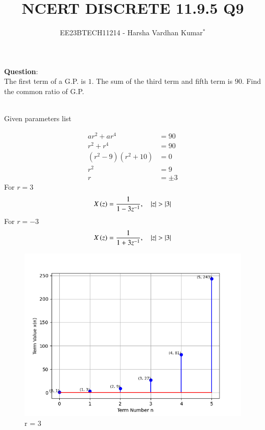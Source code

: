 \documentclass[journal,12pt,twocolumn]{IEEEtran}
\theoremstyle{remark}
\begin{document}

\vspace{3cm}
\title{NCERT DISCRETE 11.9.5 Q9}
\author{EE23BTECH11214 - Harsha Vardhan Kumar$^{*}$%
}
\maketitle
\newpage
\bigskip
\textbf{Question}:\\
The first term of a G.P. is $1$. The sum of the third term and fifth
term is $90$. Find the common ratio of G.P.
\\
\solution\\
\begin{table}[htbp]
\centering

\caption{Given parameters list}
\end{table}
\begin{align}
ar^2 + ar^4 &= 90 \\
r^2 + r^4 &= 90 \\
(r^2 - 9)(r^2 + 10) &= 0 \\
r^2 &= 9 \\
r &= \pm 3
\end{align}
For $r = 3$
\begin{align}
X\left(z\right) = \frac{1}{1 - 3z^{-1}}  , \quad \left\vert z\right\vert > \left\vert3\right\vert
\end{align}
For $r = -3$
\begin{align}
X\left(z\right) = \frac{1}{1 + 3z^{-1}}  , \quad \left\vert z\right\vert > \left\vert3\right\vert
\end{align}
\begin{figure}
   \centering
     \includegraphics[width=1\columnwidth, height=1\columnwidth]{figs/graph.png}
     \caption{r = 3}
\end{figure}
\end{document}
